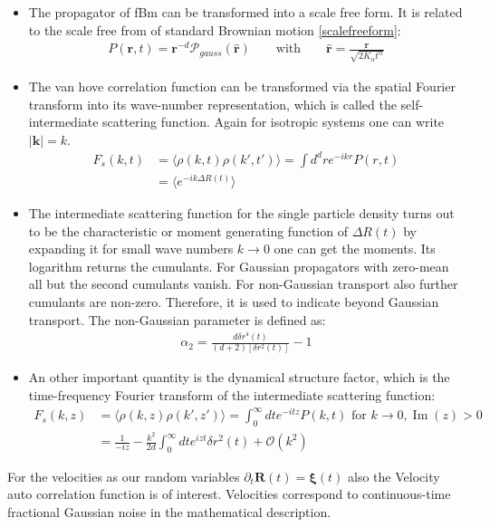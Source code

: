 \documentclass[
  a4paper,BCOR10mm,oneside,
  headsepline,footsepline,%
  fleqn,openbib
]{scrbook}
\begin{document}
\begin{itemize}
\item The propagator of fBm can be transformed into a scale free form. It is related to the scale free from of standard Brownian motion \cref{scalefreeform}:
\begin{align}
P(\bm{r},t)= \bm{r}^{-d} \mathcal{P}_{gauss}(\hat{\bm{r}})  \qquad \text{with} \qquad \hat{\bm{r}} = \frac{\bm{r}}{\sqrt{2 K_{\alpha} t^{\alpha}}} \label{scalefreeformfrac}
\end{align}
\item The van hove correlation function can be transformed via the spatial Fourier transform into its wave-number representation, which is called the self-intermediate scattering function. Again for isotropic systems one can write $|\bm{k}|=k$.
\begin{align}
 F_{s}(k,t)&=\langle\rho(k,t) \rho(k',t')\rangle=\int d^{d}r e^{-i k r} P(r,t) \\
 &=\langle e^{-i k \Delta R(t)} \rangle
\end{align}
\item 
The intermediate scattering function for the single particle density turns out to be the characteristic or moment generating function of $\Delta R(t)$ by expanding it for small wave numbers $k \rightarrow 0$ one can get the moments. Its logarithm returns the cumulants. For Gaussian propagators with zero-mean all but the second cumulants vanish. For non-Gaussian transport also further cumulants are non-zero. Therefore, it is used to indicate beyond Gaussian transport. The non-Gaussian parameter is defined as:
\begin{align}
 \alpha_2=\frac{d \delta r^{4}(t)}{(d+2) [\delta r^{2}(t)]}-1 \label{nongaussian2}
\end{align}
\item
An other important quantity is the dynamical structure factor, which is the time-frequency Fourier transform of the intermediate scattering function:
\begin{align}
 F_{s}(k,z)&=\langle\rho(k,z) \rho(k',z')\rangle=\int_{0}^{\infty} d t e^{-i t z} P(k,t) \text{ for } k \rightarrow 0 , \operatorname{Im}(z) > 0 \label{dynamicstructurfactor}\\
 &= \frac{1}{-iz}-\frac{k^2}{2d}\int_{0}^{\infty} d t e^{izt} \delta r^2 (t) + \mathcal{O}(k^2)
\end{align}
\end{itemize}
For the velocities as our random variables $\partial_t \bm{R}(t)=\bm{\xi}(t)$ also the Velocity auto correlation function is of interest. Velocities correspond to continuous-time fractional Gaussian noise in the mathematical description.
\end{document}
